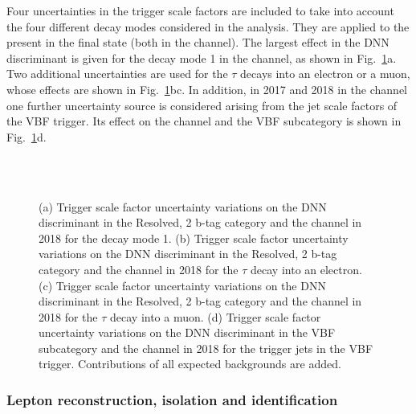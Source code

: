 \documentclass[../main.tex]{subfiles}
\begin{document}
Four uncertainties in the trigger scale factors are included to take into account the four different \tauh{} decay modes considered in the analysis. They are applied to the \tauh{} present in the final state (both in the \tauh\tauh{} channel). The largest effect in the DNN discriminant is given for the decay mode 1 in the \tauh\tauh{} channel, as shown in Fig.~\ref{hh:fig:trig_syst}a. Two additional uncertainties are used for the $\tau$ decays into an electron or a muon, whose effects are shown in Fig.~\ref{hh:fig:trig_syst}bc. In addition, in 2017 and 2018 in the \tauh\tauh{} channel one further uncertainty source is considered arising from the jet scale factors of the VBF trigger. Its effect on the \tauh\tauh{} channel and the VBF subcategory is shown in Fig.~\ref{hh:fig:trig_syst}d.



\begin{figure}[h!]
\begin{center}
\\
\\
\end{center}
\caption[Trigger scale factor uncertainties]{(a) Trigger scale factor uncertainty variations on the DNN discriminant in the Resolved, 2 b-tag category and the \tauh\tauh{} channel in 2018 for the decay mode 1. (b) Trigger scale factor uncertainty variations on the DNN discriminant in the Resolved, 2 b-tag category and the \taue\tauh{} channel in 2018 for the $\tau$ decay into an electron. (c) Trigger scale factor uncertainty variations on the DNN discriminant in the Resolved, 2 b-tag category and the \taumu\tauh{} channel in 2018 for the $\tau$ decay into a muon. (d) Trigger scale factor uncertainty variations on the DNN discriminant in the VBF subcategory and the \tauh\tauh{} channel in 2018 for the trigger jets in the VBF trigger. Contributions of all expected backgrounds are added.}
\label{hh:fig:trig_syst}
\end{figure}

\subsubsection*{Lepton reconstruction, isolation and identification}
\end{document}

